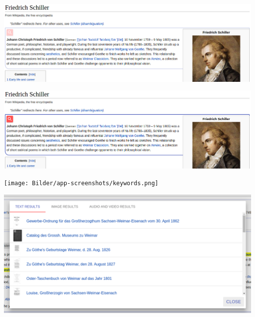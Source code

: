 \begin{minipage}{\linewidth}
	\centering
	\includegraphics[width=\linewidth]{Bilder/app-screenshots/paragraph-unhovered.png}
	\label{fig:paragraph}
 \end{minipage}
 \begin{minipage}{\linewidth}
	\centering
	\includegraphics[width=\linewidth]{Bilder/app-screenshots/paragraph-hovered.png}
	\label{fig:paragraphHover}
 \end{minipage}
 \begin{minipage}{\linewidth}
	\centering
	\texttt{[image: Bilder/app-screenshots/keywords.png]}
	\label{fig:keywords}
 \end{minipage}
 \begin{minipage}{\linewidth}
	\centering
	\includegraphics[width=\linewidth]{Bilder/app-screenshots/text-results.png}
	\label{fig:textResults}
 \end{minipage}
